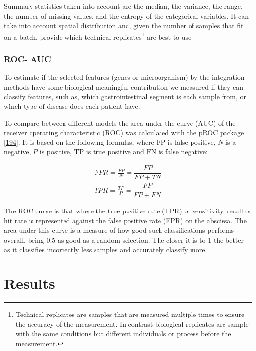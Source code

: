 \documentclass[
  12pt,
  a4paper,
  twoside,
  openright]{book}
\begin{document}
Summary statistics taken into account are the median, the variance, the range, the number of missing values, and the entropy of the categorical variables.
It can take into account spatial distribution and, given the number of samples that fit on a batch, provide which technical replicates\footnote{Technical replicates are samples that are measured multiple times to ensure the accuracy of the measurement.
  In contrast biological replicates are sample with the same conditions but different individuals or process before the measurement.} are best to use.

\hypertarget{ROC}{%
\subsection{ROC- AUC}\label{ROC}}

To estimate if the selected features (genes or microorganism) by the integration methods have some biological meaningful contribution we measured if they can classify features, such as, which gastrointestinal segment is each sample from, or which type of disease does each patient have.

To compare between different models the area under the curve (AUC) of the receiver operating characteristic (ROC) was calculated with the \href{https://cran.r-project.org/package=pROC}{pROC} package {[}\protect\hyperlink{ref-robin2011}{194}{]}.
It is based on the following formulas, where \(\text{FP}\) is false positive, \(N\) is a negative, \(P\) is positive, \(\text{TP}\) is true positive and \(\text{FN}\) is false negative:

\[
\begin{aligned}
FPR = \frac{FP}{N} = \dfrac{FP}{FP+TN} \\
TPR = \frac{TP}{P} = \dfrac{FP}{FP+FN} 
\end{aligned}
\]

The ROC curve is that where the true positive rate (TPR) or sensitivity, recall or hit rate is represented against the false positive rate (FPR) on the abscissa.
The area under this curve is a measure of how good such classifications performs overall, being 0.5 as good as a random selection.
The closer it is to 1 the better as it classifies incorrectly less samples and accurately classify more.

\hypertarget{results}{%
\chapter{Results}\label{results}}
\end{document}
